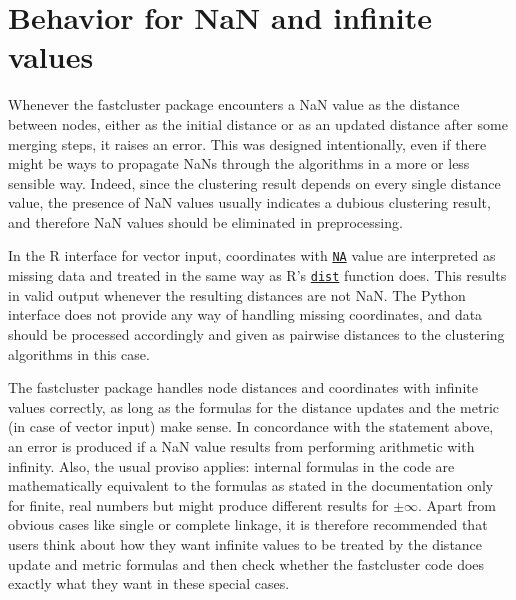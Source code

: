 \documentclass[fontsize=10pt,paper=letter,BCOR=-6mm,DIV=8]{scrartcl}
\newcommand*\dist{\href{https://stat.ethz.ch/R-manual/R-patched/library/stats/html/dist.html}{\texttt{dist}}}
\newcommand*\NA{\href{https://stat.ethz.ch/R-manual/R-patched/library/base/html/NA.html}{\texttt{NA}}}
\begin{document}
\section{Behavior for NaN and infinite values}\label{sec:infnan}

Whenever the fastcluster package encounters a NaN value as the distance between nodes, either as the initial distance or as an updated distance after some merging steps, it raises an error. This was designed intentionally, even if there might be ways to propagate NaNs through the algorithms in a more or less sensible way. Indeed, since the clustering result depends on every single distance value, the presence of NaN values usually indicates a dubious clustering result, and therefore NaN values should be eliminated in preprocessing.

In the R interface for vector input, coordinates with {\NA} value are interpreted as missing data and treated in the same way as R's {\dist} function does. This results in valid output whenever the resulting distances are not NaN. The Python interface does not provide any way of handling missing coordinates, and data should be processed accordingly and given as pairwise distances to the clustering algorithms in this case.

The fastcluster package handles node distances and coordinates with infinite values correctly, as long as the formulas for the distance updates and the metric (in case of vector input) make sense. In concordance with the statement above, an error is produced if a NaN value results from performing arithmetic with infinity. Also, the usual proviso applies: internal formulas in the code are mathematically equivalent to the formulas as stated in the documentation only for finite, real numbers but might produce different results for $\pm\infty$. Apart from obvious cases like single or complete linkage, it is therefore recommended that users think about how they want infinite values to be treated by the distance update and metric formulas and then check whether the fastcluster code does exactly what they want in these special cases.
\end{document}
